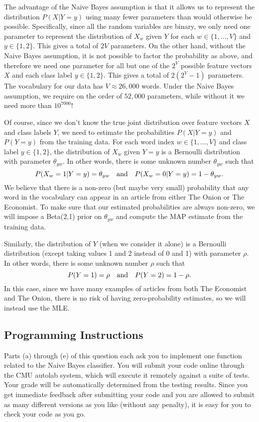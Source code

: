 \documentclass{article}
\begin{document}
The advantage of the Naive Bayes assumption is that it allows us to
represent the distribution $P(X | Y = y)$ using many fewer parameters
than would otherwise be possible. Specifically, since all the random
variables are binary, we only need one parameter to represent the
distribution of $X_w$ given $Y$ for each $w \in \{1, \dots, V\}$ and
$y \in \{1,2\}$. This gives a total of $2V$ parameters. On the other
hand, without the Naive Bayes assumption, it is not possible to factor
the probability as above, and therefore we need one parameter for all
but one of the $2^V$ possible feature vectors $X$ and each class label
$y \in \{1,2\}$.  This gives a total of $2(2^V - 1)$ parameters. The
vocabulary for our data has $V \approx 26,000$ words. Under the Naive
Bayes assumption, we require on the order of $52,000$ parameters,
while without it we need more than $10^{7000}$!

Of course, since we don't know the true joint distribution over
feature vectors $X$ and class labels $Y$, we need to estimate the
probabilities $P(X | Y = y)$ and $P(Y = y)$ from the training
data. For each word index $w \in \{1, \dots, V\}$ and class label
$y \in \{1,2\}$, the distribution of $X_w$ given $Y=y$ is a Bernoulli
distribution with parameter $\theta_{yw}$.  In other words, there is
some unknown number $\theta_{yw}$ such that
\[
P(X_w = 1 | Y = y) = \theta_{yw}
\quad\hbox{and}\quad
P(X_w = 0 | Y = y) = 1 - \theta_{yw}.
\]
We believe that there is a non-zero (but maybe very small) probability
that any word in the vocabulary can appear in an article from either
The Onion or The Economist. To make sure that our estimated
probabilities are always non-zero, we will impose a Beta(2,1) prior on
$\theta_{yw}$ and compute the MAP estimate from the training data.

Similarly, the distribution of $Y$ (when we consider it alone) is a
Bernoulli distribution (except taking values 1 and 2 instead of 0 and
1) with parameter $\rho$. In other words, there is some unknown number
$\rho$ such that
\[
P(Y = 1) = \rho
\quad\hbox{and}\quad
P(Y = 2) = 1 - \rho.
\]
In this case, since we have many examples of articles from both The
Economist and The Onion, there is no risk of having zero-probability
estimates, so we will instead use the MLE.

\subsection*{Programming Instructions}

Parts (a) through (e) of this question each ask you to implement one
function related to the Naive Bayes classifier. You will submit your
code online through the CMU autolab system, which will execute it
remotely against a suite of tests. Your grade will be automatically
determined from the testing results. Since you get immediate feedback
after submitting your code and you are allowed to submit as many
different versions as you like (without any penalty), it is easy for
you to check your code as you go.
\end{document}
